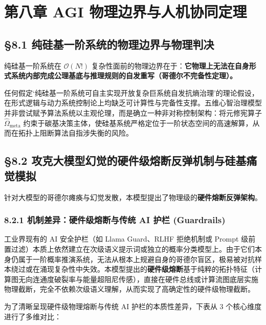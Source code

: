 \documentclass[11pt,a4paper,oneside]{ctexart}
\begin{document}
\section{第八章 AGI 物理边界与人机协同定理}

\subsection{§8.1 纯硅基一阶系统的物理边界与物理判决}

纯硅基一阶系统在 $\mathcal{O}(N!)$ 复杂性面前的物理边界在于：\textbf{它物理上无法在自身形式系统内部完成公理基底与推理规则的自发重写（哥德尔不完备性定理）。}


任何假定‘纯硅基一阶系统可自主实现开放复杂巨系统自发抗熵治理’的理论假设，在形式逻辑与动力系统控制论上均缺乏可计算性与完备性支撑。五维心智治理模型并非尝试赋予算法系统以主观伦理，而是确立一种非对称控制架构：将元修宪算子 $\hat{\Omega}_{\text{meta}}$ 约束于碳基决策主体，使硅基系统严格定位于一阶状态空间的高速解算，从而在拓扑上阻断算法自指涉失衡的风险。


\subsection{§8.2 攻克大模型幻觉的硬件级熔断反弹机制与硅基痛觉模拟}

针对大模型的哥德尔瘫痪与幻觉发散，本模型提出了物理级的\textbf{硬件熔断反弹架构}。


\subsubsection{8.2.1 机制差异：硬件级熔断与传统 AI 护栏 (Guardrails)}

工业界现有的 AI 安全护栏（如 Llama Guard、RLHF 拒绝机制或 Prompt 级前置过滤）本质上依然建立在次级语义提示词或独立的概率分类模型上。由于它们本身仍属于一阶概率推演系统，无法从根本上规避自身的哥德尔盲区，极易被对抗样本绕过或在涌现复杂性中失效。本模型提出的\textbf{硬件级熔断}基于纯粹的拓扑特征（计算图无向连通度破裂率与能量超阻尼传感），直接在硬件总线或计算流图底层实施物理截断，完全不依赖次级语义理解，从而实现了高确定性的硬件级物理截断。


为了清晰呈现硬件级物理熔断与传统 AI 护栏的本质性差异，下表从 3 个核心维度进行了多维对比：
\end{document}
